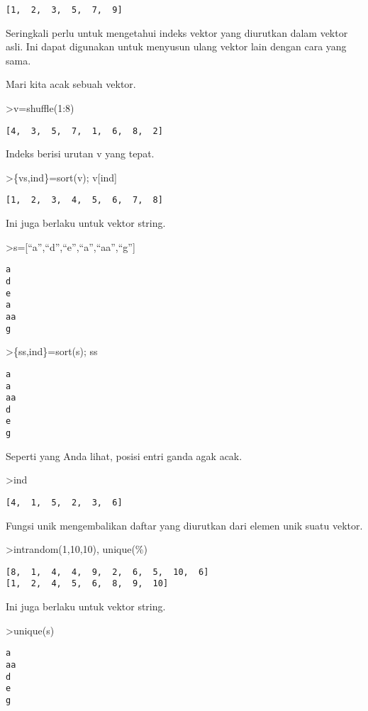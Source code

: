 \documentclass[
]{book}
\begin{document}
\begin{verbatim}
[1,  2,  3,  5,  7,  9]
\end{verbatim}

Seringkali perlu untuk mengetahui indeks vektor yang diurutkan dalam vektor asli. Ini dapat digunakan untuk menyusun ulang vektor lain dengan cara yang sama.

Mari kita acak sebuah vektor.

\textgreater v=shuffle(1:8)

\begin{verbatim}
[4,  3,  5,  7,  1,  6,  8,  2]
\end{verbatim}

Indeks berisi urutan v yang tepat.

\textgreater\{vs,ind\}=sort(v); v{[}ind{]}

\begin{verbatim}
[1,  2,  3,  4,  5,  6,  7,  8]
\end{verbatim}

Ini juga berlaku untuk vektor string.

\textgreater s={[}``a'',``d'',``e'',``a'',``aa'',``g''{]}

\begin{verbatim}
a
d
e
a
aa
g
\end{verbatim}

\textgreater\{ss,ind\}=sort(s); ss

\begin{verbatim}
a
a
aa
d
e
g
\end{verbatim}

Seperti yang Anda lihat, posisi entri ganda agak acak.

\textgreater ind

\begin{verbatim}
[4,  1,  5,  2,  3,  6]
\end{verbatim}

Fungsi unik mengembalikan daftar yang diurutkan dari elemen unik suatu vektor.

\textgreater intrandom(1,10,10), unique(\%)

\begin{verbatim}
[8,  1,  4,  4,  9,  2,  6,  5,  10,  6]
[1,  2,  4,  5,  6,  8,  9,  10]
\end{verbatim}

Ini juga berlaku untuk vektor string.

\textgreater unique(s)

\begin{verbatim}
a
aa
d
e
g
\end{verbatim}
\end{document}
